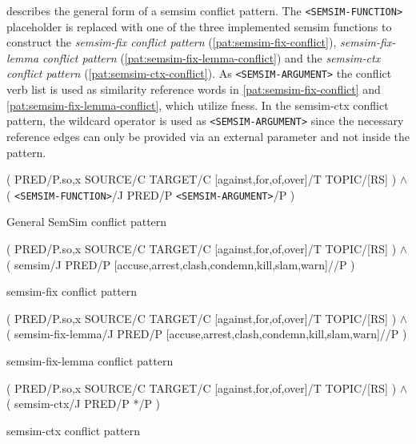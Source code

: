 \documentclass[11pt]{scrreprt}
\begin{document}
{ describes the general form of a semsim conflict pattern. The \texttt{<SEMSIM-FUNCTION>} placeholder is replaced with one of the three implemented semsim functions to construct the \textit{semsim-fix conflict pattern} (\cref{pat:semsim-fix-conflict}), \textit{semsim-fix-lemma conflict pattern} (\cref{pat:semsim-fix-lemma-conflict}) and the \textit{semsim-ctx conflict pattern} (\cref{pat:semsim-ctx-conflict}). As \texttt{<SEMSIM-ARGUMENT>} the conflict verb list is used as similarity reference words in \cref{pat:semsim-fix-conflict} and \cref{pat:semsim-fix-lemma-conflict}, which utilize \gls{fness}. In the semsim-ctx conflict pattern, the wildcard operator is used as \texttt{<SEMSIM-ARGUMENT>} since the necessary reference edges can only be provided via an external parameter and not inside the pattern.


\begin{pattern}[H]
  \normalfont\sffamily
  \centering
  ( PRED/P.{so,x} SOURCE/C TARGET/C [against,for,of,over]/T TOPIC/[RS] ) \(\wedge\)\\ 
  ( \texttt{<SEMSIM-FUNCTION>}/J PRED/P \texttt{<SEMSIM-ARGUMENT>}/P )
  \caption{General SemSim conflict pattern}
  \label{pat:semsim-conflict}
\end{pattern}

\begin{pattern}[H]
  \normalfont\sffamily
  \centering
  ( PRED/P.{so,x} SOURCE/C TARGET/C [against,for,of,over]/T TOPIC/[RS] ) \(\wedge\)\\ 
  ( semsim/J PRED/P [accuse,arrest,clash,condemn,kill,slam,warn]//P )
  \caption{semsim-fix conflict pattern}
  \label{pat:semsim-fix-conflict}
\end{pattern}

\begin{pattern}[H]
  \normalfont\sffamily
  \centering
  ( PRED/P.{so,x} SOURCE/C TARGET/C [against,for,of,over]/T TOPIC/[RS] ) \(\wedge\)\\ 
  ( semsim-fix-lemma/J PRED/P [accuse,arrest,clash,condemn,kill,slam,warn]//P )
  \caption{semsim-fix-lemma conflict pattern}
  \label{pat:semsim-fix-lemma-conflict}
\end{pattern}

\begin{pattern}[H]
  \normalfont\sffamily
  \centering
  ( PRED/P.{so,x} SOURCE/C TARGET/C [against,for,of,over]/T TOPIC/[RS] ) \(\wedge\)\\ 
  ( semsim-ctx/J PRED/P */P )
  \caption{semsim-ctx conflict pattern}
  \label{pat:semsim-ctx-conflict}
\end{pattern}



}
\end{document}

